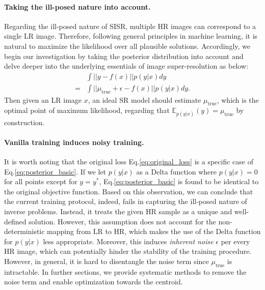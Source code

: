 \documentclass[letterpaper]{article} %
\begin{document}
\paragraph{Taking the ill-posed nature into account.}
%
Regarding the ill-posed nature of SISR, multiple HR images can correspond to a single LR image. Therefore, following general principles in machine learning, it is natural to maximize the likelihood over all plausible solutions.
%
Accordingly, we begin our investigation by taking the posterior distribution into account and delve deeper into the underlying essentials of image super-resolution as below:
\begin{equation}
    \label{eq:posterior_basic}
    \begin{aligned}
          & \int ||y-f(x)||p(y|x)dy \\
        = & \int ||\mu_{\text{true}} + \epsilon - f(x) ||p(y|x)dy
        .
    \end{aligned}
\end{equation}
Then given an LR image $x$, an ideal SR model should estimate $\mu_{\text{true}}$, which is the optimal point of maximum likelihood, regarding that $\mathbb{E}_{p(y|x)}(y)=\mu_{\text{true}}$ by construction.


\paragraph{Vanilla training induces noisy training.}
It is worth noting that the original loss Eq.\eqref{eq:original_loss} is a specific case of Eq.\eqref{eq:posterior_basic}. If we let $p(y|x)$ as a Delta function where $p(y|x)=0$ for all points except for $y=y^*$, Eq.\eqref{eq:posterior_basic} is found to be identical to the original objective function.
%
Based on this observation, we can conclude that the current training protocol, indeed, fails in capturing the ill-posed nature of inverse problems. Instead, it treats the given HR sample as a unique and well-defined solution.
%
However, this assumption does not account for the non-deterministic mapping from LR to HR, which makes the use of the Delta function for $p(y|x)$ less appropriate.
%
Moreover, this induces \textit{inherent noise} $\epsilon$ per every HR image, which can potentially hinder the stability of the training procedure.
%
However, in general, it is hard to disentangle the noise term since $\mu_{\text{true}}$ is intractable.
%
In further sections, we provide systematic methods to remove the noise term and enable optimization towards the centroid.
\end{document}
